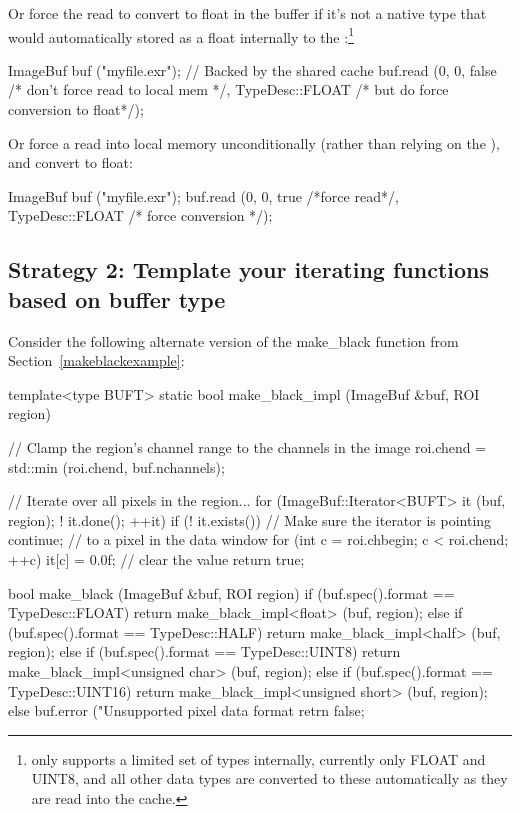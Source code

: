 \noindent Or force the read to convert to {\cf float} in the buffer if
it's not a native type that would automatically stored as a {\cf float}
internally to the \ImageCache:\footnote{\ImageCache only supports a
limited set of types internally, currently only FLOAT and UINT8, and all
other data types are converted to these automatically as they are read
into the cache.}

\begin{code}
    ImageBuf buf ("myfile.exr");   // Backed by the shared cache
    buf.read (0, 0, false /* don't force read to local mem */,
              TypeDesc::FLOAT /* but do force conversion to float*/);
\end{code}

\noindent Or force a read into local memory unconditionally (rather
than relying on the \ImageCache), and convert to {\cf float}:

\begin{code}
    ImageBuf buf ("myfile.exr");
    buf.read (0, 0, true /*force read*/,
              TypeDesc::FLOAT /* force conversion */);
\end{code}

\subsection*{Strategy 2: Template your iterating functions based on
buffer type}

Consider the following alternate version of the {\cf make_black} function
from Section~\ref{makeblackexample}:

\begin{code}
template<type BUFT>
static bool make_black_impl (ImageBuf &buf, ROI region)
{
    // Clamp the region's channel range to the channels in the image
    roi.chend = std::min (roi.chend, buf.nchannels);

    // Iterate over all pixels in the region...
    for (ImageBuf::Iterator<BUFT> it (buf, region);  ! it.done();  ++it) {
        if (! it.exists())   // Make sure the iterator is pointing
            continue;        //   to a pixel in the data window
        for (int c = roi.chbegin;  c < roi.chend;  ++c)
            it[c] = 0.0f;  // clear the value
    }
    return true;
}

bool make_black (ImageBuf &buf, ROI region)
{
    if (buf.spec().format == TypeDesc::FLOAT)
        return make_black_impl<float> (buf, region);
    else if (buf.spec().format == TypeDesc::HALF)
        return make_black_impl<half> (buf, region);
    else if (buf.spec().format == TypeDesc::UINT8)
        return make_black_impl<unsigned char> (buf, region);
    else if (buf.spec().format == TypeDesc::UINT16)
        return make_black_impl<unsigned short> (buf, region);
    else {
        buf.error ("Unsupported pixel data format %
        retrn false;
    }
}
\end{code}

